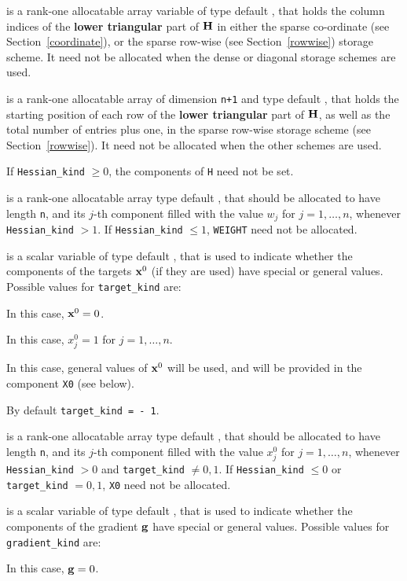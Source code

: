 \documentclass{galahad}
\begin{document}
\begin{description}
\begin{description}
 is a rank-one allocatable array variable of type default \integer,
that holds the column indices of the {\bf lower triangular} part of 
${\mathbf{H}}$ in either the sparse co-ordinate 
(see Section~\ref{coordinate}), or the sparse row-wise 
(see Section~\ref{rowwise}) storage scheme.
It need not be allocated when the dense or diagonal storage schemes are used.

 is a rank-one allocatable array of dimension {\tt n+1} and type 
default \integer, that holds the starting position of 
each row of the {\bf lower triangular} part of ${\mathbf{H}}$, as well
as the total number of entries plus one, in the sparse row-wise storage
scheme (see Section~\ref{rowwise}). It need not be allocated when the
other schemes are used.

\end{description}
If {\tt Hessian\_kind} $\geq 0$, the components of {\tt H} need not be set.

 is a rank-one allocatable array type default \realdp, that 
should be allocated to have length {\tt n}, and its $j$-th component 
filled with the value $w_{j}$ for $j = 1, \ldots , n$, 
whenever {\tt Hessian\_kind} $>1$.
If {\tt Hessian\_kind} $\leq 1$, {\tt WEIGHT} need not be allocated.

 is a scalar variable of type default \integer, 
that is used to indicate whether the components of the targets ${\mathbf{x}}^0$ 
(if they are used) have special or general values. Possible values for 
{\tt target\_kind} are:
\begin{description}
  In this case, ${\mathbf{x}}^0 = 0$.

 In this case, $x^0_{j} = 1$ for $j = 1, \ldots , n$.

 In this case, general values of ${\mathbf{x}}^0$ will be used,
     and will be provided in the component {\tt X0} (see below).
\end{description}
By default {\tt target\_kind = - 1}.

 is a rank-one allocatable array type default \realdp, that 
should be allocated to have length {\tt n}, and its $j$-th component 
filled with the value $x_{j}^0$ for $j = 1, \ldots , n$, 
whenever {\tt Hessian\_kind} $>0$ and {\tt target\_kind} $\neq 0,1$.
If {\tt Hessian\_kind} $\leq 0$ or {\tt target\_kind} $= 0,1$,
{\tt X0} need not be allocated.

 is a scalar variable of type default \integer, 
that is used to indicate whether the components of the gradient ${\mathbf{g}}$ 
have special or general values. Possible values for {\tt gradient\_kind} are:
\begin{description}
  In this case, ${\mathbf{g}} = 0$.


\end{description}
\end{description}
\end{document}
